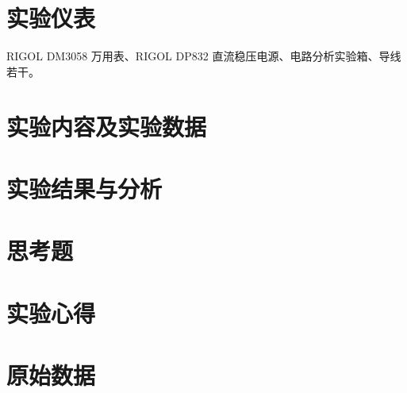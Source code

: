\documentclass[a4paper,utf8]{article}
\begin{document}
\section{实验仪表}
    RIGOL DM3058 万用表、RIGOL DP832 直流稳压电源、电路分析实验箱、导线若干。
\section{实验内容及实验数据}
\section{实验结果与分析}
\section{思考题}
\section{实验心得}
\section{原始数据}
\end{document}
